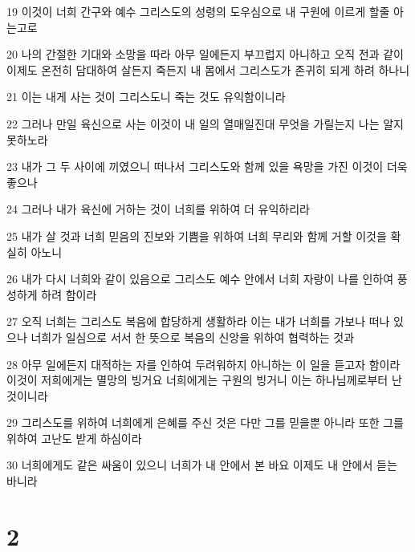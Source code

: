 \par 19 이것이 너희 간구와 예수 그리스도의 성령의 도우심으로 내 구원에 이르게 할줄 아는고로
\par 20 나의 간절한 기대와 소망을 따라 아무 일에든지 부끄럽지 아니하고 오직 전과 같이 이제도 온전히 담대하여 살든지 죽든지 내 몸에서 그리스도가 존귀히 되게 하려 하나니
\par 21 이는 내게 사는 것이 그리스도니 죽는 것도 유익함이니라
\par 22 그러나 만일 육신으로 사는 이것이 내 일의 열매일진대 무엇을 가릴는지 나는 알지 못하노라
\par 23 내가 그 두 사이에 끼였으니 떠나서 그리스도와 함께 있을 욕망을 가진 이것이 더욱 좋으나
\par 24 그러나 내가 육신에 거하는 것이 너희를 위하여 더 유익하리라
\par 25 내가 살 것과 너희 믿음의 진보와 기쁨을 위하여 너희 무리와 함께 거할 이것을 확실히 아노니
\par 26 내가 다시 너희와 같이 있음으로 그리스도 예수 안에서 너희 자랑이 나를 인하여 풍성하게 하려 함이라
\par 27 오직 너희는 그리스도 복음에 합당하게 생활하라 이는 내가 너희를 가보나 떠나 있으나 너희가 일심으로 서서 한 뜻으로 복음의 신앙을 위하여 협력하는 것과
\par 28 아무 일에든지 대적하는 자를 인하여 두려워하지 아니하는 이 일을 듣고자 함이라 이것이 저희에게는 멸망의 빙거요 너희에게는 구원의 빙거니 이는 하나님께로부터 난 것이니라
\par 29 그리스도를 위하여 너희에게 은혜를 주신 것은 다만 그를 믿을뿐 아니라 또한 그를 위하여 고난도 받게 하심이라
\par 30 너희에게도 같은 싸움이 있으니 너희가 내 안에서 본 바요 이제도 내 안에서 듣는 바니라

\chapter{2}

